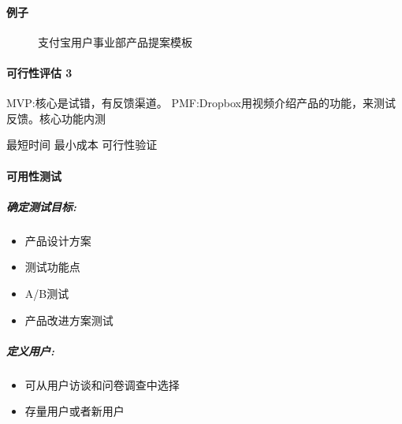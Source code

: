 \documentclass[letterpaper,11pt,english]{sphinxmanual}
\begin{document}
\paragraph{例子}
\label{\detokenize{chapter_knowledge/BRD:id9}}
\begin{figure}[H]
\centering
\capstart

\noindent{}
\caption{支付宝用户事业部产品提案模板}\label{\detokenize{chapter_knowledge/BRD:id20}}\end{figure}


\paragraph{可行性评估 3\sphinxfootnotemark[415]}
\label{\detokenize{chapter_knowledge/BRD:id10}}%
\begin{footnotetext}[415]\sphinxAtStartFootnote
{}
%
\end{footnotetext}\ignorespaces 
MVP:核心是试错，有反馈渠道。
PMF:Dropbox用视频介绍产品的功能，来测试反馈。核心功能内测

最短时间 最小成本 可行性验证


\paragraph{可用性测试}
\label{\detokenize{chapter_knowledge/BRD:id11}}

\subparagraph{确定测试目标:}
\label{\detokenize{chapter_knowledge/BRD:id12}}\begin{itemize}
\item {} 
产品设计方案

\item {} 
测试功能点

\item {} 
A/B测试

\item {} 
产品改进方案测试

\end{itemize}


\subparagraph{定义用户:}
\label{\detokenize{chapter_knowledge/BRD:id13}}\begin{itemize}
\item {} 
可从用户访谈和问卷调查中选择

\item {} 
存量用户或者新用户

\end{itemize}
\end{document}
